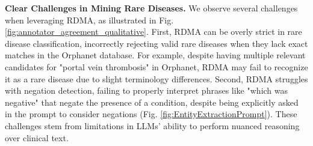 \textbf{Clear Challenges in Mining Rare Diseases.} We observe several challenges when leveraging RDMA, as illustrated in Fig. \ref{fig:annotator_agreement_qualitative}. First, RDMA can be overly strict in rare disease classification, incorrectly rejecting valid rare diseases when they lack exact matches in the Orphanet database. For example, despite having multiple relevant candidates for "portal vein thrombosis" in Orphanet, RDMA may fail to recognize it as a rare disease due to slight terminology differences. Second, RDMA struggles with negation detection, failing to properly interpret phrases like "which was negative" that negate the presence of a condition, despite being explicitly asked in the prompt to consider negations (Fig. \ref{fig:EntityExtractionPrompt}). These challenges stem from limitations in LLMs' ability to perform nuanced reasoning over clinical text.

